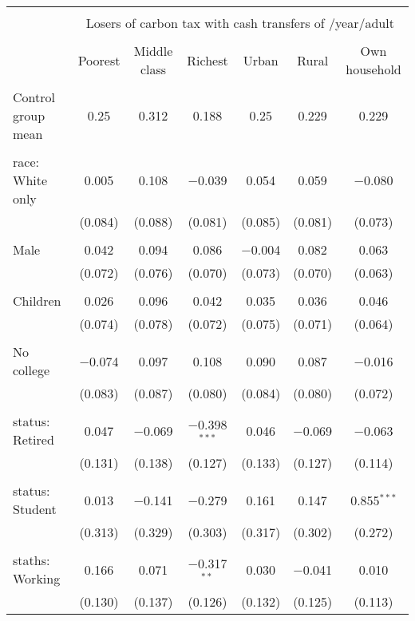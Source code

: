 
\begin{tabular}{@{\extracolsep{5pt}}lcccccc} 
\\[-1.8ex]\hline 
\hline \\[-1.8ex] 
 & \multicolumn{6}{c}{Losers of carbon tax with cash transfers of \textdollar 600/year/adult} \\ 
\cline{2-7} 
\\[-1.8ex] & Poorest & Middle class & Richest & Urban & Rural & Own household \\ 
\hline \\[-1.8ex] 
 Control group mean & 0.25 & 0.312 & 0.188 & 0.25 & 0.229 & 0.229  \\ \hline \\[-1.8ex] race: White only & 0.005 & 0.108 & $-$0.039 & 0.054 & 0.059 & $-$0.080 \\ 
  & (0.084) & (0.088) & (0.081) & (0.085) & (0.081) & (0.073) \\ 
  & & & & & & \\ 
 Male & 0.042 & 0.094 & 0.086 & $-$0.004 & 0.082 & 0.063 \\ 
  & (0.072) & (0.076) & (0.070) & (0.073) & (0.070) & (0.063) \\ 
  & & & & & & \\ 
 Children & 0.026 & 0.096 & 0.042 & 0.035 & 0.036 & 0.046 \\ 
  & (0.074) & (0.078) & (0.072) & (0.075) & (0.071) & (0.064) \\ 
  & & & & & & \\ 
 No college & $-$0.074 & 0.097 & 0.108 & 0.090 & 0.087 & $-$0.016 \\ 
  & (0.083) & (0.087) & (0.080) & (0.084) & (0.080) & (0.072) \\ 
  & & & & & & \\ 
 status: Retired & 0.047 & $-$0.069 & $-$0.398$^{***}$ & 0.046 & $-$0.069 & $-$0.063 \\ 
  & (0.131) & (0.138) & (0.127) & (0.133) & (0.127) & (0.114) \\ 
  & & & & & & \\ 
 status: Student & 0.013 & $-$0.141 & $-$0.279 & 0.161 & 0.147 & 0.855$^{***}$ \\ 
  & (0.313) & (0.329) & (0.303) & (0.317) & (0.302) & (0.272) \\ 
  & & & & & & \\ 
 staths: Working & 0.166 & 0.071 & $-$0.317$^{**}$ & 0.030 & $-$0.041 & 0.010 \\ 
  & (0.130) & (0.137) & (0.126) & (0.132) & (0.125) & (0.113) \\ 

\end{tabular}
